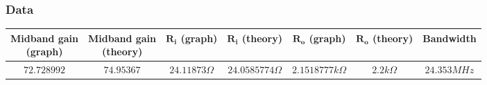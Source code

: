 \documentclass{article}
\begin{document}
\subsubsection{Data}
\begin{tabular}{|c|c|c|c|c|c|c|}
\hline
\makecell{\textbf{Midband gain} \\ \textbf{(graph)}} & \makecell{\textbf{Midband gain} \\ \textbf{(theory)}} & \makecell{$\mathbf{R_i}$ \\ \textbf{(graph)}} & \makecell{{$\mathbf{R_i}$} \\ \textbf{(theory)}} & \makecell{{$\mathbf{R_o}$} \\ \textbf{(graph)}} & \makecell{{$\mathbf{R_o}$} \\ \textbf{(theory)}} & \textbf{Bandwidth} \\
\hline
$72.728992$ & $74.95367$ & $24.11873\Omega$ & $24.0585774\Omega$& $2.1518777k\Omega$ & $2.2 k\Omega$ & $24.353MHz$ \\
\hline
\end{tabular}
\end{document}
